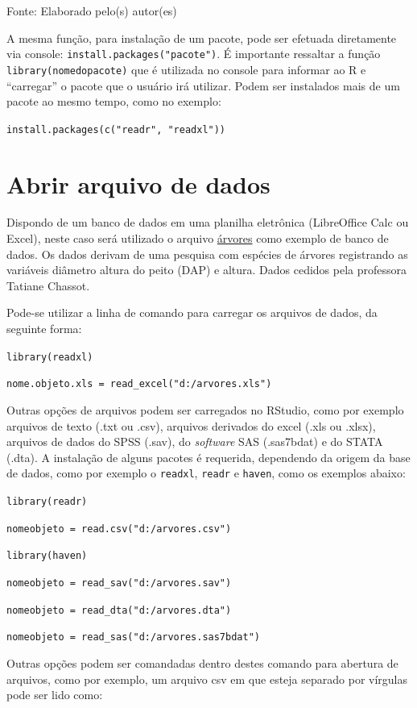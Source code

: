 \documentclass[12pt,brazil,oneside]{book}
\begin{document}
Fonte: Elaborado pelo(s) autor(es)

A mesma função, para instalação de um pacote, pode ser efetuada diretamente via console: \texttt{install.packages("pacote")}. É importante ressaltar a função \texttt{library(nomedopacote)} que é utilizada no console para informar ao R e ``carregar'' o pacote que o usuário irá utilizar. Podem ser instalados mais de um pacote ao mesmo tempo, como no exemplo:

\texttt{install.packages(c("readr",\ "readxl"))}

\hypertarget{abrir-arquivo-de-dados}{%
\section{Abrir arquivo de dados}\label{abrir-arquivo-de-dados}}

Dispondo de um banco de dados em uma planilha eletrônica (LibreOffice Calc ou Excel), neste caso será utilizado o arquivo \href{https://github.com/Smolski/livror/raw/master/arvores.xlsx}{árvores} como exemplo de banco de dados. Os dados derivam de uma pesquisa com espécies de árvores registrando as variáveis diâmetro altura do peito (DAP) e altura. Dados cedidos pela professora Tatiane Chassot.

Pode-se utilizar a linha de comando para carregar os arquivos de dados, da seguinte forma:

\texttt{library(readxl)}

\texttt{nome.objeto.xls\ =\ read\_excel("d:/arvores.xls")}

Outras opções de arquivos podem ser carregados no RStudio, como por exemplo arquivos de texto (.txt ou .csv), arquivos derivados do excel (.xls ou .xlsx), arquivos de dados do SPSS (.sav), do \emph{software} SAS (.sas7bdat) e do STATA (.dta). A instalação de alguns pacotes é requerida, dependendo da origem da base de dados, como por exemplo o \texttt{readxl}, \texttt{readr} e \texttt{haven}, como os exemplos abaixo:

\texttt{library(readr)}

\texttt{nomeobjeto\ =\ read.csv("d:/arvores.csv")}

\texttt{library(haven)}

\texttt{nomeobjeto\ =\ read\_sav("d:/arvores.sav")}

\texttt{nomeobjeto\ =\ read\_dta("d:/arvores.dta")}

\texttt{nomeobjeto\ =\ read\_sas("d:/arvores.sas7bdat")}

Outras opções podem ser comandadas dentro destes comando para abertura de arquivos, como por exemplo, um arquivo csv em que esteja separado por vírgulas pode ser lido como:
\end{document}

